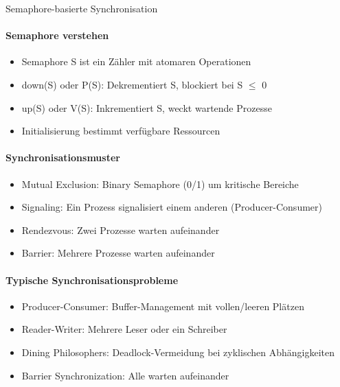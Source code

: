 \begin{KR}{Semaphore-basierte Synchronisation}
    \paragraph{Semaphore verstehen}
    \begin{itemize}
        \item Semaphore S ist ein Zähler mit atomaren Operationen
        \item down(S) oder P(S): Dekrementiert S, blockiert bei S $\leq$  0
        \item up(S) oder V(S): Inkrementiert S, weckt wartende Prozesse
        \item Initialisierung bestimmt verfügbare Ressourcen
    \end{itemize}
    
    \paragraph{Synchronisationsmuster}
    \begin{itemize}
        \item Mutual Exclusion: Binary Semaphore (0/1) um kritische Bereiche
        \item Signaling: Ein Prozess signalisiert einem anderen (Producer-Consumer)
        \item Rendezvous: Zwei Prozesse warten aufeinander
        \item Barrier: Mehrere Prozesse warten aufeinander
    \end{itemize}
    
    \paragraph{Typische Synchronisationsprobleme}
    \begin{itemize}
        \item Producer-Consumer: Buffer-Management mit vollen/leeren Plätzen
        \item Reader-Writer: Mehrere Leser oder ein Schreiber
        \item Dining Philosophers: Deadlock-Vermeidung bei zyklischen Abhängigkeiten
        \item Barrier Synchronization: Alle warten aufeinander
    \end{itemize}
    

\end{KR}
